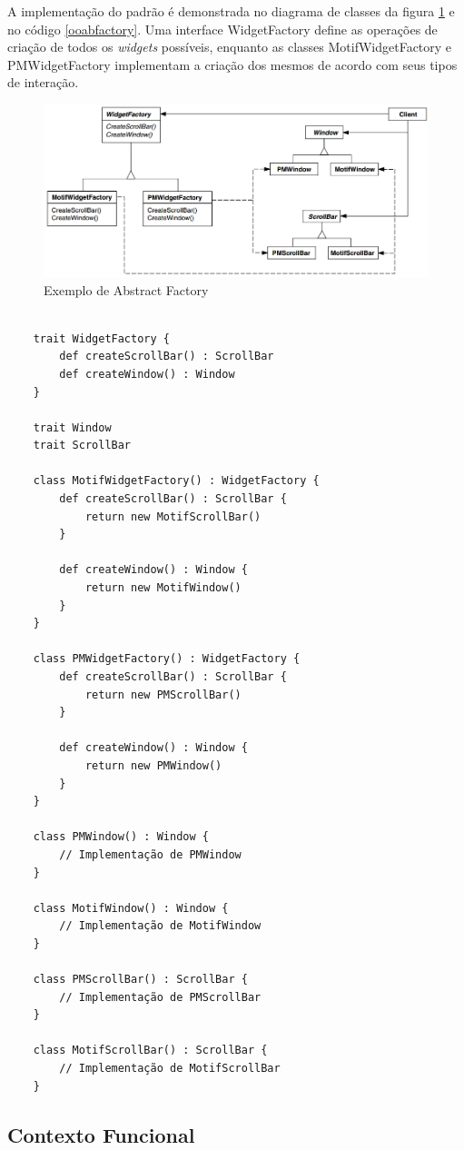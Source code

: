 A implementação do padrão é demonstrada no 
diagrama de classes da figura \ref{abfactory_exemplo} 
e no código \ref{ooabfactory}. Uma interface 
WidgetFactory define as operações de criação 
de todos os \textit{widgets} possíveis, enquanto 
as classes MotifWidgetFactory e PMWidgetFactory 
implementam a criação dos mesmos de acordo 
com seus tipos de interação.

\begin{figure}[htb]
	\caption{\label{abfactory_exemplo}Exemplo de Abstract Factory}
	\begin{center}
	    \includegraphics[scale=0.4]{5_padroes-contexto-funcional/5.1_criacionais/5.1.2_abstract-factory/exemplo_abfactory.png}
	\end{center}
\end{figure}

\begin{lstlisting}[caption={Abstract Factory Orientado a Objetos},label=ooabfactory]
	
	trait WidgetFactory {
		def createScrollBar() : ScrollBar
		def createWindow() : Window
	}

	trait Window 
	trait ScrollBar

	class MotifWidgetFactory() : WidgetFactory {
		def createScrollBar() : ScrollBar {
			return new MotifScrollBar()
		}

		def createWindow() : Window {
			return new MotifWindow()
		}
	}

	class PMWidgetFactory() : WidgetFactory {
		def createScrollBar() : ScrollBar {
			return new PMScrollBar()
		}

		def createWindow() : Window {
			return new PMWindow()
		}
	}

	class PMWindow() : Window {
		// Implementação de PMWindow
	}

	class MotifWindow() : Window {
		// Implementação de MotifWindow
	}

	class PMScrollBar() : ScrollBar {
		// Implementação de PMScrollBar
	}

	class MotifScrollBar() : ScrollBar {
		// Implementação de MotifScrollBar
	}

\end{lstlisting}



\subsection*{Contexto Funcional}

\begin{lstlisting}[caption={Abstract Factory Funcional},label=fpabfactory]
    
    

\end{lstlisting}